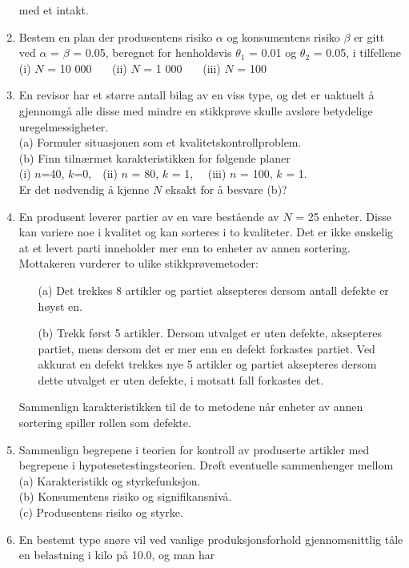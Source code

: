 \begin{enumerate}
med et intakt.
\item
Bestem en plan der produsentens risiko $\alpha$ og konsumentens risiko
$\beta$ er gitt ved $\alpha$ = $\beta$ = 0.05, beregnet for henholdsvis
${\theta}_1$ = 0.01 og ${\theta}_2$ = 0.05, i tilfellene 
(i) $N$ = 10 000  \ \ \     (ii)  $N$ = 1 000  \ \ \   (iii)  $N$ = 100
\item
En revisor har et større antall bilag av en viss type, og det er 
uaktuelt å gjennomgå alle disse med mindre en stikkprøve
skulle avsløre betydelige uregelmessigheter. \\
(a) Formuler situasjonen som et kvalitetskontrollproblem. \\
(b) Finn tilnærmet karakteristikken for følgende planer \\
 (i) $n$=40, $k$=0,\ \ (ii) $n$ = 80, $k$ = 1, \ \ (iii) $n$ = 100, $k$ = 1.\\
Er det nødvendig å kjenne $N$ eksakt for å besvare (b)?
\item
En produsent leverer partier av en vare bestående av $N$ = 25
enheter.  Disse kan variere noe i kvalitet og kan sorteres i to kvaliteter.
Det er ikke ønskelig at et levert parti inneholder mer enn to enheter
av annen sortering.  Mottakeren vurderer to ulike stikkprøvemetoder: 
\begin{itemize}
\item[(a)] Det trekkes 8 artikler og partiet aksepteres dersom antall defekte
    er høyst en.
\item[(b)] Trekk først 5 artikler. Dersom utvalget er uten defekte, 
   aksepteres partiet, mens dersom det er mer enn en defekt forkastes partiet.
    Ved akkurat en defekt trekkes nye 5 artikler og partiet aksepteres dersom
    dette utvalget er uten defekte, i motsatt fall forkastes det.
\end{itemize}
Sammenlign karakteristikken til de to metodene når enheter av annen 
sortering spiller rollen som defekte.
\item
Sammenlign begrepene i teorien for kontroll av produserte artikler med 
begrepene i hypotesetestingsteorien.  Drøft eventuelle sammenhenger
mellom \\
(a) Karakteristikk og styrkefunksjon. \\
(b) Konsumentens risiko og signifikansnivå. \\
(c) Produsentens risiko og styrke. \\
\item
En bestemt type snøre vil ved vanlige produksjonsforhold 
gjennom\-snitt\-lig tåle en belastning i kilo på 10.0, og man har 

\end{enumerate}
